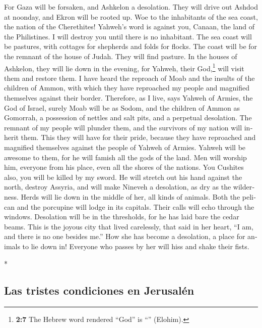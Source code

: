 \begin{paracol}{2}
\begin{otherlanguage}{english}
 For Gaza will be forsaken, and Ashkelon a desolation.
They will drive out Ashdod at noonday, and Ekron will be rooted up.
 Woe to the inhabitants of the sea coast, the nation of
the Cherethites! Yahweh's word is against you, Canaan, the land of the
Philistines. I will destroy you until there is no inhabitant.
 The sea coast will be pastures, with cottages for
shepherds and folds for flocks.  The coast will be for the
remnant of the house of Judah. They will find pasture. In the houses of
Ashkelon, they will lie down in the evening, for Yahweh, their
God,\footnote{\textbf{2:7} The Hebrew word rendered ``God'' is
  ``'' (Elohim).} will visit them and restore them.
 I have heard the reproach of Moab and the insults of the
children of Ammon, with which they have reproached my people and
magnified themselves against their border.  Therefore, as
I live, says Yahweh of Armies, the God of Israel, surely Moab will be as
Sodom, and the children of Ammon as Gomorrah, a possession of nettles
and salt pits, and a perpetual desolation. The remnant of my people will
plunder them, and the survivors of my nation will inherit them.
 This they will have for their pride, because they have
reproached and magnified themselves against the people of Yahweh of
Armies.  Yahweh will be awesome to them, for he will
famish all the gods of the land. Men will worship him, everyone from his
place, even all the shores of the nations.  You Cushites
also, you will be killed by my sword.  He will stretch
out his hand against the north, destroy Assyria, and will make Nineveh a
desolation, as dry as the wilderness.  Herds will lie
down in the middle of her, all kinds of animals. Both the pelican and
the porcupine will lodge in its capitals. Their calls will echo through
the windows. Desolation will be in the thresholds, for he has laid bare
the cedar beams.  This is the joyous city that lived
carelessly, that said in her heart, ``I am, and there is no one besides
me.'' How she has become a desolation, a place for animals to lie down
in! Everyone who passes by her will hiss and shake their fists.

\end{otherlanguage}

\switchcolumn[0]*

\hypertarget{las-tristes-condiciones-en-jerusaluxe9n}{%
\subsection{Las tristes condiciones en
Jerusalén}\label{las-tristes-condiciones-en-jerusaluxe9n}}


\end{paracol}
